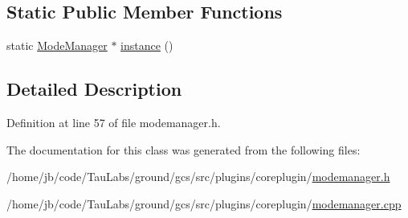 \subsection*{\-Static \-Public \-Member \-Functions}
\begin{DoxyCompactItemize}
\item 
static \hyperlink{class_core_1_1_mode_manager}{\-Mode\-Manager} $\ast$ \hyperlink{group___core_plugin_ga756ec59f5104cce0abf8a6990a2bba2c}{instance} ()
\end{DoxyCompactItemize}


\subsection{\-Detailed \-Description}


\-Definition at line 57 of file modemanager.\-h.



\-The documentation for this class was generated from the following files\-:\begin{DoxyCompactItemize}
\item 
/home/jb/code/\-Tau\-Labs/ground/gcs/src/plugins/coreplugin/\hyperlink{modemanager_8h}{modemanager.\-h}\item 
/home/jb/code/\-Tau\-Labs/ground/gcs/src/plugins/coreplugin/\hyperlink{modemanager_8cpp}{modemanager.\-cpp}\end{DoxyCompactItemize}
